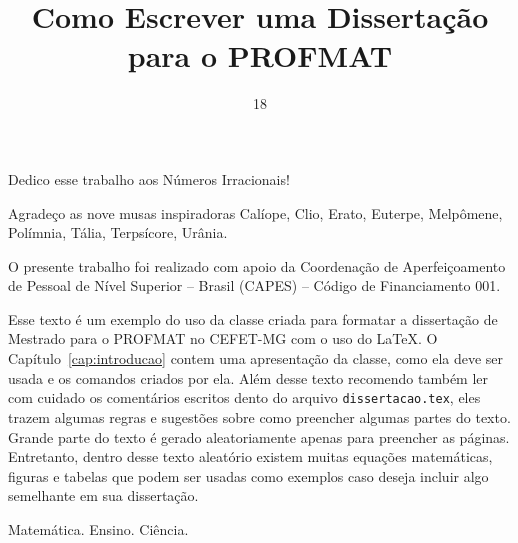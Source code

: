 \documentclass[fleqn]{profmat-cefet}
\title{Como Escrever uma Dissertação para o PROFMAT}
\date{18}{11}{2021}
\newcommand{\texfile}  {\texttt{dissertacao.tex}}
\begin{document}

\begin{dedication} 

Dedico esse trabalho aos Números Irracionais!

\end{dedication}

\begin{acknowledgement} 


\noindent
Agradeço as nove musas inspiradoras Calíope, Clio, Erato, Euterpe, Melpômene,
Polímnia, Tália, Terpsícore, Urânia.

%
%
\vspace{2\baselineskip}\noindent
O presente trabalho foi realizado com apoio da Coordenação de Aperfeiçoamento 
de Pessoal de Nível Superior -- Brasil (CAPES) -- Código de Financiamento 001.

\end{acknowledgement}

\begin{Resumo}


Esse texto é um exemplo do uso da classe criada para formatar
a dissertação de Mestrado para o PROFMAT no CEFET-MG com o uso do \LaTeX{}.
O Capítulo~\ref{cap:introducao} contem uma apresentação 
da classe, como ela deve ser usada e os comandos criados por 
ela. Além desse texto recomendo também ler com cuidado os comentários escritos
dento do arquivo \texfile{}, eles trazem algumas regras e 
sugestões sobre como preencher algumas partes do texto.
Grande parte do texto é gerado aleatoriamente apenas para preencher as páginas. 
Entretanto, dentro desse texto aleatório existem muitas equações matemáticas, 
figuras e tabelas que podem ser usadas como exemplos caso deseja incluir
algo semelhante em sua dissertação.

\PalavrasChave Matemática. Ensino. Ciência.

\end{Resumo}
\end{document}
